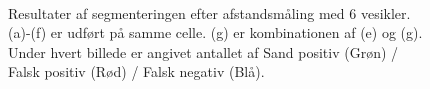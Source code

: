 \begin{figure}[H]
  \hspace{0.1cm}
  \hspace{0.1cm}
  \\
  \caption{Resultater af segmenteringen efter afstandsmåling med 6 vesikler. (a)-(f) er udført på samme celle. (g) er kombinationen af (e) og (g). Under hvert billede er angivet antallet af Sand positiv (Grøn) / Falsk positiv (Rød) / Falsk negativ (Blå).}
  \label{fig:animalssssssssssss}
\end{figure}
